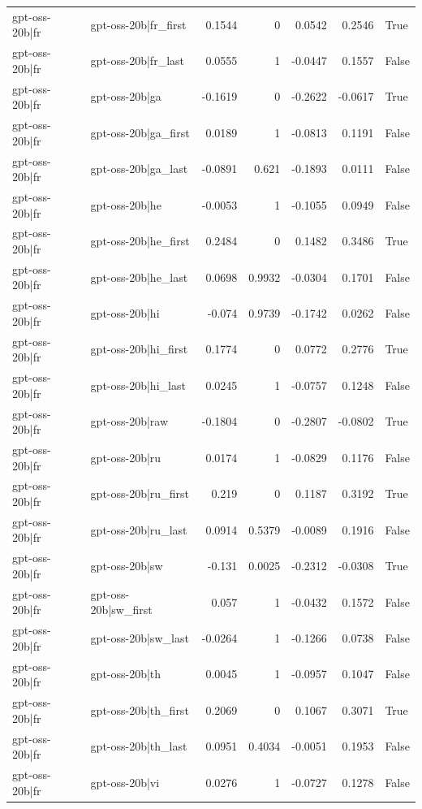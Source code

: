 \begin{table}
\begin{tabular}{l l r r r r l}
gpt-oss-20b|fr & gpt-oss-20b|fr_first & 0.1544 & 0 & 0.0542 & 0.2546 & True \\
gpt-oss-20b|fr & gpt-oss-20b|fr_last & 0.0555 & 1 & -0.0447 & 0.1557 & False \\
gpt-oss-20b|fr & gpt-oss-20b|ga & -0.1619 & 0 & -0.2622 & -0.0617 & True \\
gpt-oss-20b|fr & gpt-oss-20b|ga_first & 0.0189 & 1 & -0.0813 & 0.1191 & False \\
gpt-oss-20b|fr & gpt-oss-20b|ga_last & -0.0891 & 0.621 & -0.1893 & 0.0111 & False \\
gpt-oss-20b|fr & gpt-oss-20b|he & -0.0053 & 1 & -0.1055 & 0.0949 & False \\
gpt-oss-20b|fr & gpt-oss-20b|he_first & 0.2484 & 0 & 0.1482 & 0.3486 & True \\
gpt-oss-20b|fr & gpt-oss-20b|he_last & 0.0698 & 0.9932 & -0.0304 & 0.1701 & False \\
gpt-oss-20b|fr & gpt-oss-20b|hi & -0.074 & 0.9739 & -0.1742 & 0.0262 & False \\
gpt-oss-20b|fr & gpt-oss-20b|hi_first & 0.1774 & 0 & 0.0772 & 0.2776 & True \\
gpt-oss-20b|fr & gpt-oss-20b|hi_last & 0.0245 & 1 & -0.0757 & 0.1248 & False \\
gpt-oss-20b|fr & gpt-oss-20b|raw & -0.1804 & 0 & -0.2807 & -0.0802 & True \\
gpt-oss-20b|fr & gpt-oss-20b|ru & 0.0174 & 1 & -0.0829 & 0.1176 & False \\
gpt-oss-20b|fr & gpt-oss-20b|ru_first & 0.219 & 0 & 0.1187 & 0.3192 & True \\
gpt-oss-20b|fr & gpt-oss-20b|ru_last & 0.0914 & 0.5379 & -0.0089 & 0.1916 & False \\
gpt-oss-20b|fr & gpt-oss-20b|sw & -0.131 & 0.0025 & -0.2312 & -0.0308 & True \\
gpt-oss-20b|fr & gpt-oss-20b|sw_first & 0.057 & 1 & -0.0432 & 0.1572 & False \\
gpt-oss-20b|fr & gpt-oss-20b|sw_last & -0.0264 & 1 & -0.1266 & 0.0738 & False \\
gpt-oss-20b|fr & gpt-oss-20b|th & 0.0045 & 1 & -0.0957 & 0.1047 & False \\
gpt-oss-20b|fr & gpt-oss-20b|th_first & 0.2069 & 0 & 0.1067 & 0.3071 & True \\
gpt-oss-20b|fr & gpt-oss-20b|th_last & 0.0951 & 0.4034 & -0.0051 & 0.1953 & False \\
gpt-oss-20b|fr & gpt-oss-20b|vi & 0.0276 & 1 & -0.0727 & 0.1278 & False \\

\end{tabular}
\end{table}
